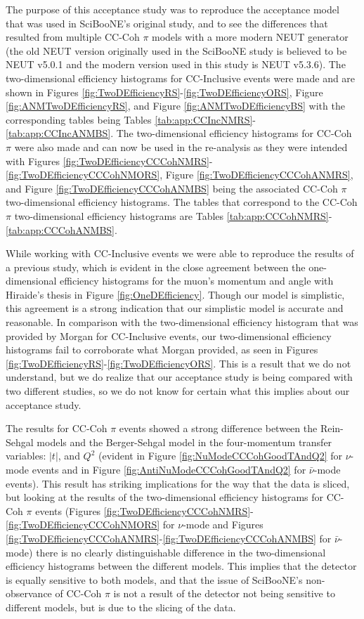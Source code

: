 \documentclass[11pt]{article}
\begin{document}
The purpose of this acceptance study was to reproduce the acceptance model that was used in SciBooNE's original study, and to see the differences that resulted from multiple CC-Coh $\pi$ models with a more modern NEUT generator (the old NEUT version originally used in the SciBooNE study is believed to be NEUT v5.0.1 and the modern version used in this study is NEUT v5.3.6). The two-dimensional efficiency histograms for CC-Inclusive events were made and are shown in Figures \ref*{fig:TwoDEfficiencyRS}-\ref*{fig:TwoDEfficiencyORS}, Figure \ref*{fig:ANMTwoDEfficiencyRS}, and Figure \ref*{fig:ANMTwoDEfficiencyBS} with the corresponding tables being Tables \ref*{tab:app:CCIncNMRS}-\ref*{tab:app:CCIncANMBS}. The two-dimensional efficiency histograms for CC-Coh $\pi$ were also made and can now be used in the re-analysis as they were intended with Figures \ref*{fig:TwoDEfficiencyCCCohNMRS}-\ref*{fig:TwoDEfficiencyCCCohNMORS}, Figure \ref*{fig:TwoDEfficiencyCCCohANMRS}, and Figure \ref*{fig:TwoDEfficiencyCCCohANMBS} being the associated CC-Coh $\pi$ two-dimensional efficiency histograms. The tables that correspond to the CC-Coh $\pi$ two-dimensional efficiency histograms are Tables \ref*{tab:app:CCCohNMRS}-\ref*{tab:app:CCCohANMBS}.

While working with CC-Inclusive events we were able to reproduce the results of a previous study, which is evident in the close agreement between the one-dimensional efficiency histograms for the muon's momentum and angle with Hiraide's thesis in Figure \ref*{fig:OneDEfficiency}. Though our model is simplistic, this agreement is a strong indication that our simplistic model is accurate and reasonable. In comparison with the two-dimensional efficiency histogram that was provided by Morgan for CC-Inclusive events, our two-dimensional efficiency histograms fail to corroborate what Morgan provided, as seen in Figures \ref*{fig:TwoDEfficiencyRS}-\ref*{fig:TwoDEfficiencyORS}. This is a result that we do not understand, but we do realize that our acceptance study is being compared with two different studies, so we do not know for certain what this implies about our acceptance study.

The results for CC-Coh $\pi$ events showed a strong difference between the Rein-Sehgal models and the Berger-Sehgal model in the four-momentum transfer variables: $|t|$, and $Q^2$ (evident in Figure \ref*{fig:NuModeCCCohGoodTAndQ2} for $\nu$-mode events and in Figure \ref*{fig:AntiNuModeCCCohGoodTAndQ2} for $\bar{\nu}$-mode events). This result has striking implications for the way that the data is sliced, but looking at the results of the two-dimensional efficiency histograms for CC-Coh $\pi$ events (Figures \ref*{fig:TwoDEfficiencyCCCohNMRS}-\ref*{fig:TwoDEfficiencyCCCohNMORS} for $\nu$-mode and Figures \ref*{fig:TwoDEfficiencyCCCohANMRS}-\ref*{fig:TwoDEfficiencyCCCohANMBS} for $\bar{\nu}$-mode) there is no clearly distinguishable difference in the two-dimensional efficiency histograms between the different models. This implies that the detector is equally sensitive to both models, and that the issue of SciBooNE's non-observance of CC-Coh $\pi$ is not a result of the detector not being sensitive to different models, but is due to the slicing of the data.
\end{document}
